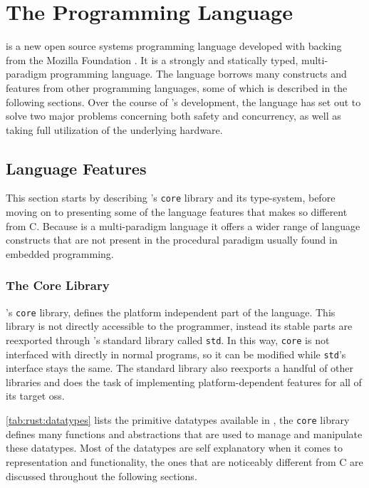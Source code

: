 
\section{The \rust Programming Language} %
\label{sub:the_rust_programming_language}

\rust \cite{web:rust_lang} is a new open source systems programming language developed with backing from the Mozilla Foundation \cite{web:mozilla_foundation}.
It is a strongly and statically typed, multi-paradigm programming language.
The language borrows many constructs and features from other programming languages, some of which is described in the following sections.
Over the course of \rust's development, the language has set out to solve two major problems concerning both safety and concurrency, as well as taking full utilization of the underlying hardware.

\subsection{Language Features}
\label{ssub:rust:features}

This section starts by describing \rust's \texttt{core} library and its type-system, before moving on to presenting some of the language features that makes \rust so different from C.
Because \rust is a multi-paradigm language it offers a wider range of language constructs that are not present in the procedural paradigm usually found in embedded programming.

\subsubsection{The Core Library}

\rust's \texttt{core} library, defines the platform independent part of the language.
This library is not directly accessible to the programmer, instead its stable parts are reexported through \rust's standard library called \texttt{std}.
In this way, \texttt{core} is not interfaced with directly in normal \rust programs, so it can be modified while \texttt{std}'s interface stays the same.
The standard library also reexports a handful of other libraries and does the task of implementing platform-dependent features for all of its target \glspl{os}.

\autoref{tab:rust:datatypes} lists the primitive datatypes available in \rust, the \texttt{core} library defines many functions and abstractions that are used to manage and manipulate these datatypes.
Most of the datatypes are self explanatory when it comes to representation and functionality, the ones that are noticeably different from C are discussed throughout the following sections.

